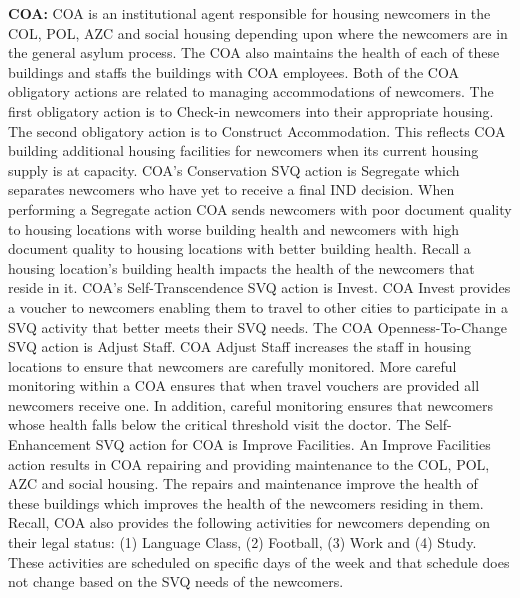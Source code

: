 \documentclass{scspaperproc}
\theoremstyle{scsthe}
\begin{document}
{\bf COA:} COA is an institutional agent responsible for housing newcomers in the COL, POL, AZC and social housing depending upon where the newcomers are in the general asylum process. The COA also maintains the health of each of these buildings and staffs the buildings with COA employees. Both of the COA obligatory actions are related to managing accommodations of newcomers. The first obligatory action is to Check-in newcomers into their appropriate housing. The second obligatory action is to Construct Accommodation. This reflects COA building additional housing facilities for newcomers when its current housing supply is at capacity. COA's Conservation SVQ action is Segregate which separates newcomers who have yet to receive a final IND decision. When performing a Segregate action COA sends newcomers with poor document quality to housing locations with worse building health and newcomers with high document quality to housing locations with better building health. Recall a housing location's building health impacts the health of the newcomers that reside in it. COA's Self-Transcendence SVQ action is Invest. COA Invest provides a voucher to newcomers enabling them to travel to other cities to participate in a SVQ activity that better meets their SVQ needs. The COA Openness-To-Change SVQ action is Adjust Staff. COA Adjust Staff increases the staff in housing locations to ensure that newcomers are carefully monitored. More careful monitoring within a COA ensures that when travel vouchers are provided all newcomers receive one. In addition, careful monitoring ensures that newcomers whose health falls below the critical threshold visit the doctor. The Self-Enhancement SVQ action for COA is Improve Facilities.  An Improve Facilities action results in COA repairing and providing maintenance to the COL, POL, AZC and social housing. The repairs and maintenance improve the health of these buildings which improves the health of the newcomers residing in them. Recall, COA also provides the following activities for newcomers depending on their legal status: (1) Language Class, (2) Football, (3) Work and (4) Study. These activities are scheduled on specific days of the week and that schedule does not change based on the SVQ needs of the newcomers.
\end{document}
